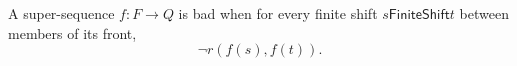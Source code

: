\begin{definition}
A super-sequence $f:F\to Q$ is bad when for every finite shift
$s\mathrel{\mathsf{FiniteShift}}t$ between members of its front,
\[
\neg r(f(s),f(t)).
\]
\end{definition}
